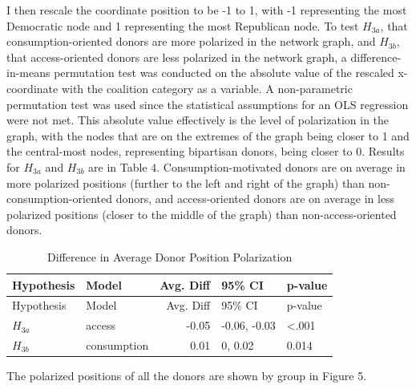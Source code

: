 \documentclass[12pt,]{article}
\begin{document}
I then rescale the coordinate position to be -1 to 1, with -1
representing the most Democratic node and 1 representing the most
Republican node. To test \(H_{3a}\), that consumption-oriented donors
are more polarized in the network graph, and \(H_{3b}\), that
access-oriented donors are less polarized in the network graph, a
difference-in-means permutation test was conducted on the absolute value
of the rescaled x-coordinate with the coalition category as a variable.
A non-parametric permutation test was used since the statistical
assumptions for an OLS regression were not met. This absolute value
effectively is the level of polarization in the graph, with the nodes
that are on the extremes of the graph being closer to 1 and the
central-most nodes, representing bipartisan donors, being closer to 0.
Results for \(H_{3a}\) and \(H_{3b}\) are in Table 4.
Consumption-motivated donors are on average in more polarized positions
(further to the left and right of the graph) than
non-consumption-oriented donors, and access-oriented donors are on
average in less polarized positions (closer to the middle of the graph)
than non-access-oriented donors.

\begin{longtable}[]{@{}llrll@{}}
\caption{Difference in Average Donor Position
Polarization}\tabularnewline
\toprule
Hypothesis & Model & Avg. Diff & 95\% CI & p-value \\
\midrule
\endfirsthead
\toprule
Hypothesis & Model & Avg. Diff & 95\% CI & p-value \\
\midrule
\endhead
\(H_{3a}\) & access & -0.05 & -0.06, -0.03 & \textless.001 \\
\(H_{3b}\) & consumption & 0.01 & 0, 0.02 & 0.014 \\
\bottomrule
\end{longtable}

The polarized positions of all the donors are shown by group in Figure
5.
\end{document}
